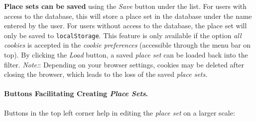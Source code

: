 \textbf{Place sets can be saved} using the \emph{Save} button under the list.
For users with access to the database, this will store a place set in the database under the name entered by the user.
For users without access to the database, the place set will only be saved to \verb!localStorage!.
This feature is only available if the option \emph{all cookies} is accepted in the \emph{cookie preferences} (accessible through the menu bar on top).
By clicking the \emph{Load} button, a saved \emph{place set} can be loaded back into the filter.
\emph{Note:}: Depending on your browser settings, cookies may be deleted after closing the browser, which leads to the loss of the saved \emph{place sets.}

\paragraph{Buttons Facilitating Creating \emph{Place Sets}.}
Buttons in the top left corner help in editing the \emph{place set} on a larger scale:

